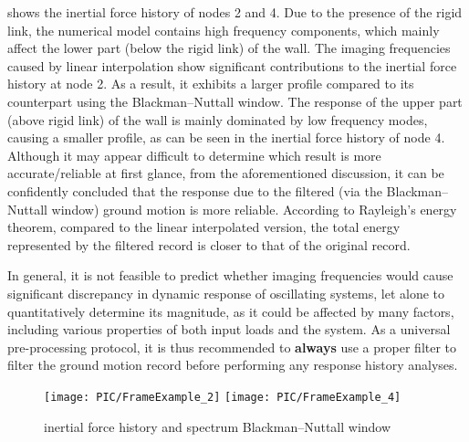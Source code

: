  shows the inertial force history of nodes 2 and 4. Due to the presence of the rigid link, the numerical model contains high frequency components, which mainly affect the lower part (below the rigid link) of the wall. The imaging frequencies caused by linear interpolation show significant contributions to the inertial force history at node 2. As a result, it exhibits a larger profile compared to its counterpart using the Blackman--Nuttall window. The response of the upper part (above rigid link) of the wall is mainly dominated by low frequency modes, causing a smaller profile, as can be seen in the inertial force history of node 4. Although it may appear difficult to determine which result is more accurate/reliable at first glance, from the aforementioned discussion, it can be confidently concluded that the response due to the filtered (via the Blackman--Nuttall window) ground motion is more reliable. According to Rayleigh’s energy theorem, compared to the linear interpolated version, the total energy represented by the filtered record is closer to that of the original record.

In general, it is not feasible to predict whether imaging frequencies would cause significant discrepancy in dynamic response of oscillating systems, let alone to quantitatively determine its magnitude, as it could be affected by many factors, including various properties of both input loads and the system. As a universal pre-processing protocol, it is thus recommended to \textbf{always} use a proper filter to filter the ground motion record before performing any response history analyses.
\begin{figure}[htb!]
\centering
\texttt{[image: PIC/FrameExample\_2]}
\texttt{[image: PIC/FrameExample\_4]}
\caption{inertial force history and spectrum Blackman--Nuttall window}\label{fig:practical_example}
\end{figure}